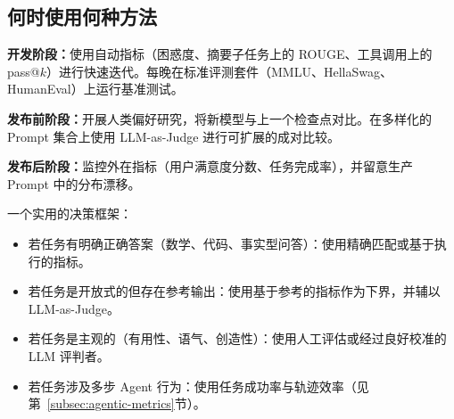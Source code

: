\subsection{何时使用何种方法}
\label{when-to-use-what}

\begin{examplebox}[对话助手的评估策略]
\textbf{开发阶段：}使用自动指标（困惑度、摘要子任务上的 ROUGE、工具调用上的 pass@$k$）进行快速迭代。每晚在标准评测套件（MMLU、HellaSwag、HumanEval）上运行基准测试。

\textbf{发布前阶段：}开展人类偏好研究，将新模型与上一个检查点对比。在多样化的 Prompt 集合上使用 LLM-as-Judge 进行可扩展的成对比较。

\textbf{发布后阶段：}监控外在指标（用户满意度分数、任务完成率），并留意生产 Prompt 中的分布漂移。
\end{examplebox}

一个实用的决策框架：

\begin{itemize}
  \item 若任务有明确正确答案（数学、代码、事实型问答）：使用精确匹配或基于执行的指标。
  \item 若任务是开放式的但存在参考输出：使用基于参考的指标作为下界，并辅以 LLM-as-Judge。
  \item 若任务是主观的（有用性、语气、创造性）：使用人工评估或经过良好校准的 LLM 评判者。
  \item 若任务涉及多步 Agent 行为：使用任务成功率与轨迹效率（见第~\ref{subsec:agentic-metrics}节）。
\end{itemize}

